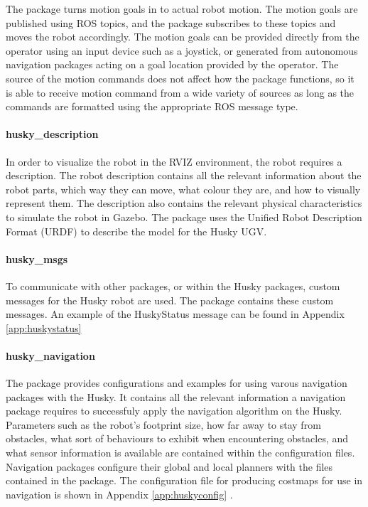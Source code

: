 The package  turns motion goals in to actual robot motion. The motion goals are published using ROS topics, and the  package subscribes to these topics and moves the robot accordingly. The motion goals can be provided directly from the operator using an input device such as a joystick, or generated from autonomous navigation packages acting on a goal location provided by the operator. The source of the motion commands does not affect how the package functions, so it is able to receive motion command from a wide variety of sources as long as the commands are formatted using the appropriate ROS message type.\\ 

\paragraph{husky\_description}

In order to visualize the robot in the RVIZ environment, the robot requires a description. The robot description contains all the relevant information about the robot parts, which way they can move, what colour they are, and how to visually represent them. The description also contains the relevant physical characteristics to simulate the robot in Gazebo. The  package uses the Unified Robot Description Format (URDF) to describe the model for the Husky UGV.\\

\paragraph{husky\_msgs}

To communicate with other packages, or within the Husky packages, custom messages for the Husky robot are used. The  package contains these custom messages. An example of the HuskyStatus message can be found in Appendix \ref{app:huskystatus}


\paragraph{husky\_navigation}

The  package provides configurations and examples for using varous navigation packages with the Husky. It contains all the relevant information a navigation package requires to successfuly apply the navigation algorithm on the Husky. Parameters such as the robot's footprint size, how far away to stay from obstacles, what sort of behaviours to exhibit when encountering obstacles, and what sensor information is available are contained within the configuration files. Navigation packages configure their global and local planners with the files contained in the  package. The configuration file for producing costmaps for use in navigation is shown in Appendix \ref{app:huskyconfig} .\\

